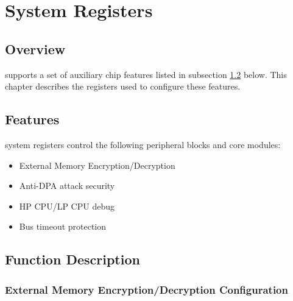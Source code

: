 \documentclass[main\_\_EN.tex]{subfiles}
\begin{document}

\ifglobal
\else
    {\let\clearpage\relax \listoftodos}
    \tableofcontents
\fi



\chapter{System Registers}
\label{mod:sysreg}
\hypertarget{sysreg}{}


\section{Overview}

\chipname{} supports a set of auxiliary chip features listed in subsection \ref{sec:sysreg-features} \textit{} below. This chapter describes the registers used to configure these features.

\section{Features}
\label{sec:sysreg-features}

\chipname{} system registers control the following peripheral blocks and core modules:

\begin{itemize}
    \item External Memory Encryption/Decryption
    \item Anti-DPA attack security
    \item HP CPU/LP CPU debug
    \item Bus timeout protection
\end{itemize}


\section{Function Description}

\subsection{External Memory Encryption/Decryption Configuration}
\end{document}
